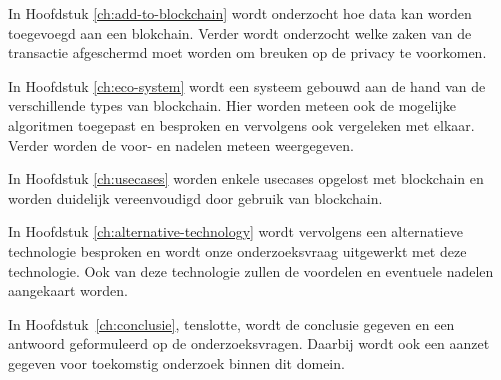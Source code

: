In Hoofdstuk \ref{ch:add-to-blockchain} wordt onderzocht hoe data kan worden toegevoegd aan een blokchain. Verder wordt onderzocht welke zaken van de transactie afgeschermd moet worden om breuken op de privacy te voorkomen. 

In Hoofdstuk \ref{ch:eco-system} wordt een systeem gebouwd aan de hand van de verschillende types van blockchain. Hier worden meteen ook de mogelijke algoritmen toegepast en besproken  en vervolgens ook vergeleken met elkaar. Verder worden de voor- en nadelen meteen weergegeven. 

In Hoofdstuk \ref{ch:usecases} worden enkele usecases opgelost met blockchain en worden duidelijk vereenvoudigd door gebruik van blockchain. 

In Hoofdstuk \ref{ch:alternative-technology} wordt vervolgens een alternatieve technologie besproken en wordt onze onderzoeksvraag uitgewerkt met deze technologie. Ook van deze technologie zullen de voordelen en eventuele nadelen aangekaart worden. 

In Hoofdstuk~\ref{ch:conclusie}, tenslotte, wordt de conclusie gegeven en een antwoord geformuleerd op de onderzoeksvragen. Daarbij wordt ook een aanzet gegeven voor toekomstig onderzoek binnen dit domein.


